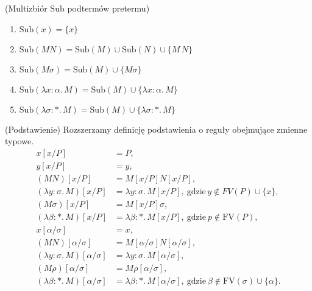 \begin{definicja}\label{def:f_subterm}(Multizbiór \(\mathrm{Sub}\) podtermów pretermu)
  \begin{enumerate}[label={(\arabic*)}, ref={\arabic*}]
    \setlength\itemsep{0em}
    \item \(\mathrm{Sub}(x)=\{x\}\)\label{def:untyped_subterm_1}    \item \(\mathrm{Sub}(MN)=\mathrm{Sub}(M)\cup\mathrm{Sub}(N)\cup\{M\,N\}\)\label{def:untyped_subterm_2}
    \item \(\mathrm{Sub}(M\sigma)=\mathrm{Sub}(M)\cup\{M\sigma\}\)\label{def:untyped_subterm_2}
    \item \(\mathrm{Sub}(\lambda x:\alpha.\, M) = \mathrm{Sub}(M)\cup \{\lambda x:\alpha.\, M\}\)\label{def:untyped_subterm_3}
    \item \(\mathrm{Sub}(\lambda \sigma:*.\, M) = \mathrm{Sub}(M)\cup \{\lambda \sigma:*.\, M\}\)\label{def:untyped_subterm_3}
  \end{enumerate}
\end{definicja}

  \begin{definicja}(Podstawienie) Rozszerzamy definicję podstawienia o reguły obejmujące zmienne typowe.
  \begin{align*}
    x[x/P] &= P,\\
    y[x/P] &= y,\\
    (MN)[x/P] &= M[x/P]N[x/P],\\
    (\lambda y:\sigma.\,M)[x/P] &= \lambda y:\sigma.\,M[x/P],\ \text{gdzie}\, y\not\in FV(P)\cup\{x\},\\
    (M\sigma)[x/P] &= M[x/P]\sigma,\\
    (\lambda \beta:*.\,M)[x/P] &= \lambda \beta:*.\,M[x/P],\ \text{gdzie}\ p\not\in\mathrm{FV}(P),\\
    x[\alpha/\sigma]&=x,\\
    (MN)[\alpha/\sigma] &= M[\alpha/\sigma]N[\alpha/\sigma],\\
    (\lambda y:\sigma.\,M)[\alpha/\sigma] &= \lambda y:\sigma.\,M[\alpha/\sigma],\\
    (M\rho)[\alpha/\sigma] &= M\rho[\alpha/\sigma],\\
    (\lambda \beta:*.\,M)[\alpha/\sigma] &= \lambda \beta:*.\,M[\alpha/\sigma],\ \text{gdzie}\ \beta\not\in\mathrm{FV}(\sigma)\cup\{\alpha\}.\\
  \end{align*}
  \end{definicja}

